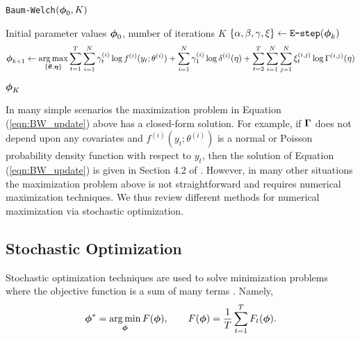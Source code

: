 %
%
%
\begin{algorithm}
\caption{\texttt{Baum-Welch}$(\boldsymbol{\phi}_0,K)$}\label{alg:EM}
\begin{algorithmic}[1]
\Require Initial parameter values $\boldsymbol{\phi}_0$, number of iterations $K$
    \State $\{\alpha,\beta,\gamma,\xi\} \gets \texttt{E-step}(\boldsymbol{\phi}_{k})$  
    \State {} $$\boldsymbol{\phi}_{k+1} \gets \operatorname*{arg\,max}_{\{\boldsymbol{\theta},\boldsymbol{\eta}\}} \sum_{t = 1}^T \sum_{i=1}^N \gamma^{(i)}_t \log f^{(i)}(y_t;\theta^{(i)}) + \sum_{i=1}^N \gamma^{(i)}_1 \log \delta^{(i)}(\eta) + \sum_{t=2}^{T} \sum_{i=1}^N \sum_{j=1}^N \xi_t^{(i,j)} \log \Gamma^{(i,j)}(\eta)$$
\EndFor
\State \Return $\boldsymbol{\phi}_K$
\end{algorithmic}
\end{algorithm}
%
In many simple scenarios the maximization problem in Equation (\ref{eqn:BW_update}) above has a closed-form solution. For example, if $\boldsymbol{\Gamma}$ does not depend upon any covariates and $f^{(i)}(y_t;\theta^{(i)})$ is a normal or Poisson probability density function with respect to $y_t$, then the solution of Equation (\ref{eqn:BW_update}) is given in Section 4.2 of \citet{Zucchini:2016}. However, in many other situations the maximization problem above is not straightforward and requires numerical maximization techniques. %
We thus review different methods for numerical maximization via stochastic optimization. %

\subsection{Stochastic Optimization}
\label{subsec:stoch_optim}

Stochastic optimization techniques are used to solve minimization problems where the objective function is a sum of many terms \citep{Robbins:1951}. %
Namely,
%
\begin{equation}
    \boldsymbol{\phi}^* = \operatorname*{arg\,min}_{\boldsymbol{\phi}} F(\boldsymbol{\phi}), \qquad F(\boldsymbol{\phi}) = \frac{1}{T}\sum_{t = 1}^T F_t(\boldsymbol{\phi}).
    \label{eqn:stoch_opt}
\end{equation}
%


